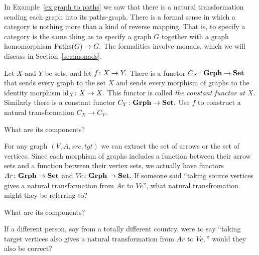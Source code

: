 \documentclass[CT4S-EN-RU]{subfiles}
\begin{document}
\begin{exampleRUS}\label{ex:concat paths of paths}
\end{exampleRUS}

\begin{remarkENG}
In Example~\ref{ex:graph to paths} we saw that there is a natural transformation sending each graph into its paths-graph. There is a formal sense in which a category is nothing more than a kind of reverse mapping. That is, to specify a category is the same thing as to specify a graph $G$ together with a graph homomorphism $\textnormal{Paths}(G)\rightarrow G.$ The formalities involve monads, which we will discuss in Section~\ref{sec:monads}.
\end{remarkENG}

\begin{remarkRUS}
\end{remarkRUS}

\begin{exerciseENG}
Let $X$ and $Y$ be sets, and let $f\colon X\rightarrow Y.$ There is a functor $C_X\colon{\mathbf{Grph}}\rightarrow{\mathbf{Set}}$ that sends every graph to the set $X$ and sends every morphism of graphs to the identity morphism $\textnormal{id}_X\colon X\rightarrow X.$ This functor is called {\em the constant functor at $X$}. Similarly there is a constant functor $C_Y\colon{\mathbf{Grph}}\rightarrow{\mathbf{Set}}.$
\sexc Use $f$ to construct a natural transformation $C_X\to C_Y.$
\item What are its components?
\endsexc
\end{exerciseENG}

\begin{exerciseRUS}
\end{exerciseRUS}

\begin{exerciseENG}
For any graph $(V,A,src,tgt)$ we can extract the set of arrows or the set of vertices. Since each morphism of graphs includes a function between their arrow sets and a function between their vertex sets, we actually have functors $Ar\colon{\mathbf{Grph}}\rightarrow{\mathbf{Set}}$ and $V\!e\colon{\mathbf{Grph}}\rightarrow{\mathbf{Set}}.$
\sexc If someone said “taking source vertices gives a natural transformation from $Ar$ to $V\!e$”, what natural transfromation might they be referring to?
\item What are its components? 
\item If a different person, say from a totally different country, were to say “taking target vertices also gives a natural transformation from $Ar$ to $V\!e,$” would they also be correct?
\endsexc
\end{exerciseENG}
\end{document}
